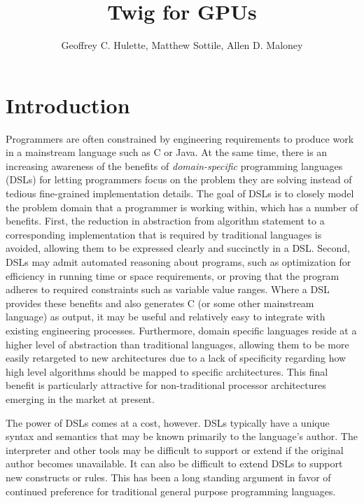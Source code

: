 \documentclass[11pt]{article}
\title{Twig for GPUs}
\author{Geoffrey C. Hulette, Matthew Sottile, Allen D. Maloney}
\begin{document}
\maketitle
\thispagestyle{empty}

\section{Introduction}

Programmers are often constrained by engineering requirements to produce work
in a mainstream language such as C or Java. At the same time, there is an
increasing awareness of the benefits of \emph{domain-specific} programming
languages (DSLs) for letting programmers focus on the problem they are solving
instead of tedious fine-grained implementation details. The goal of DSLs is to
closely model the problem domain that a programmer is working within, which
has a number of benefits. First, the reduction in abstraction from algorithm
statement to a corresponding implementation that is required by traditional
languages is avoided, allowing them to be expressed clearly and succinctly in
a DSL. Second, DSLs may admit automated reasoning about programs, such as
optimization for efficiency in running time or space requirements, or proving
that the program adheres to required constraints such as variable value
ranges. Where a DSL provides these benefits and also generates C (or some
other mainstream language) as output, it may be useful and relatively easy to
integrate with existing engineering processes. Furthermore, domain specific
languages reside at a higher level of abstraction than traditional languages,
allowing them to be more easily retargeted to new architectures due to a lack
of specificity regarding how high level algorithms should be mapped to
specific architectures. This final benefit is particularly attractive for
non-traditional processor architectures emerging in the market at present.

The power of DSLs comes at a cost, however. DSLs typically have a unique
syntax and semantics that may be known primarily to the language's author. The
interpreter and other tools may be difficult to support or extend if the
original author becomes unavailable. It can also be difficult to extend DSLs
to support new constructs or rules. This has been a long standing argument in
favor of continued preference for traditional general purpose programming
languages.

\end{document}
